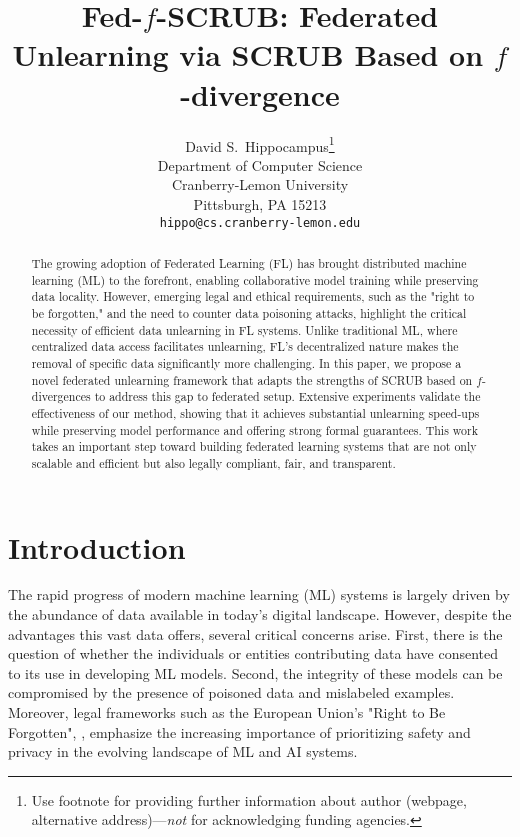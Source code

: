 \documentclass{article}
\title{Fed-$f$-SCRUB: Federated Unlearning via SCRUB Based on $f$-divergence}
\author{%
  David S.~Hippocampus\thanks{Use footnote for providing further information
    about author (webpage, alternative address)---\emph{not} for acknowledging
    funding agencies.} \\
  Department of Computer Science\\
  Cranberry-Lemon University\\
  Pittsburgh, PA 15213 \\
  \texttt{hippo@cs.cranberry-lemon.edu} \\
}
\begin{document}
\maketitle


\begin{abstract}

The growing adoption of Federated Learning (FL) has brought distributed machine learning (ML) to the forefront, enabling collaborative model training while preserving data locality. However, emerging legal and ethical requirements, such as the "right to be forgotten," and the need to counter data poisoning attacks, highlight the critical necessity of efficient data unlearning in FL systems. Unlike traditional ML, where centralized data access facilitates unlearning, FL’s decentralized nature makes the removal of specific data significantly more challenging. In this paper, we propose a novel federated unlearning framework that adapts the strengths of SCRUB based on $f$-divergences to address this gap to federated setup. Extensive experiments validate the effectiveness of our method, showing that it achieves substantial unlearning speed-ups while preserving model performance and offering strong formal guarantees. This work takes an important step toward building federated learning systems that are not only scalable and efficient but also legally compliant, fair, and transparent.

\end{abstract}
\section{Introduction}
The rapid progress of modern machine learning (ML) systems is largely driven by the abundance of data available in today’s digital landscape. However, despite the advantages this vast data offers, several critical concerns arise. First, there is the question of whether the individuals or entities contributing data have consented to its use in developing ML models. Second, the integrity of these models can be compromised by the presence of poisoned data and mislabeled examples. Moreover, legal frameworks such as the European Union’s "Right to Be Forgotten", \citep{rosen2011right}, emphasize the increasing importance of prioritizing safety and privacy in the evolving landscape of ML and AI systems.
\end{document}
